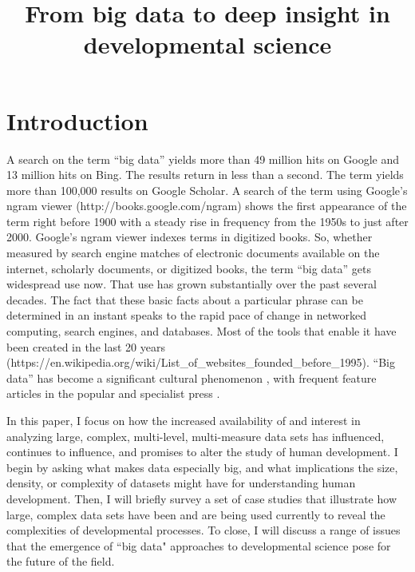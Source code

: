 \documentclass[letterpaper,man,apacite]{apa6}
\title{From big data to deep insight in developmental science}
\begin{document}
\maketitle

\section{Introduction}

A search on the term ``big data'' yields more than 49 million hits on Google and 13 million hits on Bing.
The results return in less than a second.
The term yields more than 100,000 results on Google Scholar.
A search of the term using Google's ngram viewer (http://books.google.com/ngram) shows the first appearance of the term right before 1900 with a steady rise in frequency from the 1950s to just after 2000.
Google's ngram viewer indexes terms in digitized books.
So, whether measured by search engine matches of electronic documents available on the internet, scholarly documents, or digitized books, the term ``big data'' gets widespread use now.
That use has grown substantially over the past several decades.
The fact that these basic facts about a particular phrase can be determined in an instant speaks to the rapid pace of change in networked computing, search engines, and databases.
Most of the tools that enable it have been created in the last 20 years (https://en.wikipedia.org/wiki/List_of_websites_founded_before_1995).
``Big data'' has become a significant cultural phenomenon \cite{borgman_big_2015; boyd_critical_2012}, with frequent feature articles in the popular \cite{lohr_big_2012, Marcus2013} and specialist press \cite{HBR2015, Press2013a}.

In this paper, I focus on how the increased availability of and interest in analyzing large, complex, multi-level, multi-measure data sets has influenced, continues to influence, and promises to alter the study of human development.
I begin by asking what makes data especially big, and what implications the size, density, or complexity of datasets might have for understanding human development.
Then, I will briefly survey a set of case studies that illustrate how large, complex data sets have been and are being used currently to reveal the complexities of developmental processes.
To close, I will discuss a range of issues that the emergence of ``big data" approaches to developmental science pose for the future of the field.
\end{document}
